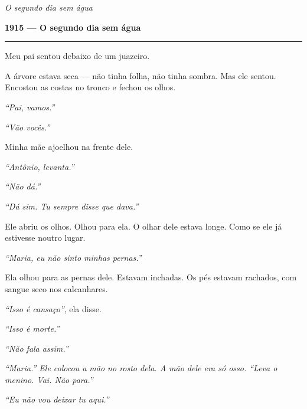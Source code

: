 
\noindent \textit{O segundo dia sem água}

\noindent \textbf{1915 --- O segundo dia sem água}

\vspace{0.5em}\noindent\rule{\textwidth}{0.5pt}\vspace{0.5em}

\noindent Meu pai sentou debaixo de um juazeiro.

\noindent A árvore estava seca --- não tinha folha, não tinha sombra. Mas ele sentou. Encostou as costas no tronco e fechou os olhos.

\noindent \textit{\textquotedblleft{}Pai, vamos.\textquotedblright{}}

\noindent \textit{\textquotedblleft{}Vão vocês.\textquotedblright{}}

\noindent Minha mãe ajoelhou na frente dele.

\noindent \textit{\textquotedblleft{}Antônio, levanta.\textquotedblright{}}

\noindent \textit{\textquotedblleft{}Não dá.\textquotedblright{}}

\noindent \textit{\textquotedblleft{}Dá sim. Tu sempre disse que dava.\textquotedblright{}}

\noindent Ele abriu os olhos. Olhou para ela. O olhar dele estava longe. Como se ele já estivesse noutro lugar.

\noindent \textit{\textquotedblleft{}Maria, eu não sinto minhas pernas.\textquotedblright{}}

\noindent Ela olhou para as pernas dele. Estavam inchadas. Os pés estavam rachados, com sangue seco nos calcanhares.

\noindent \textit{\textquotedblleft{}Isso é cansaço\textquotedblright{}}, ela disse.

\noindent \textit{\textquotedblleft{}Isso é morte.\textquotedblright{}}

\noindent \textit{\textquotedblleft{}Não fala assim.\textquotedblright{}}

\noindent \textit{\textquotedblleft{}Maria.\textquotedblright{}\textit{ Ele colocou a mão no rosto dela. A mão dele era só osso. }\textquotedblleft{}Leva o menino. Vai. Não para.\textquotedblright{}}

\noindent \textit{\textquotedblleft{}Eu não vou deixar tu aqui.\textquotedblright{}}

